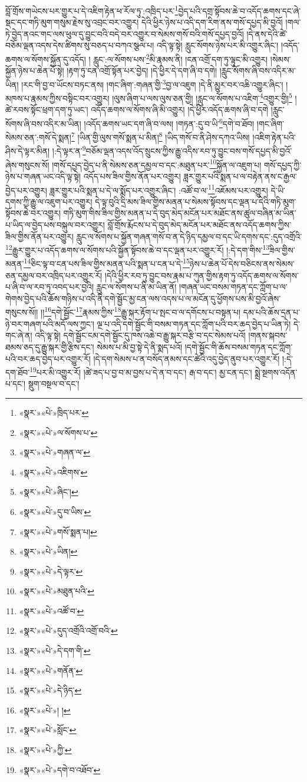 བློ་གྲོས་གཡེངས་པར་གྱུར་པ་དེ་འཇིག་རྟེན་ཕ་རོལ་ཏུ་:འཁྲིད་པར་\footnote{«སྣར་»«པེ་»ཁྲིད་པར་}བྱེད་པའི་དགྲ་སྟོབས་ཆེ་བ་འདོད་ཆགས་དང་ཞེ་སྡང་དང་གཏི་མུག་གསུམ་རྗེས་སུ་འབྲང་བར་འགྱུར། དེའི་ཕྱིར་ཉེས་པ་འདི་དག་རིག་ནས་གསོ་དཔྱད་མི་བྱའོ། །གལ་ཏེ་བྱེད་ནའང་གང་ལས་ཕུལ་དུ་བྱུང་བའི་བདེ་བར་འགྱུར་བ་སེམས་གསོ་བའི་གསོ་དཔྱད་བྱའོ། །དེ་ནས་དེའི་ཚེ་བཅོམ་ལྡན་འདས་དེས་ཚིགས་སུ་བཅད་པ་བཀའ་སྩལ་པ། འདི་ལྟ་སྟེ། རླུང་སོགས་ཉེས་པར་མི་འགྱུར་ཞིང་། །འདོད་ཆགས་ལ་སོགས་སྐྱོན་དུ་འདོད། །
རླུང་:ལ་སོགས་པས་\footnote{«སྣར་»«པེ་»ལ་སོགས་པ་}མི་རྣམས་ནི། །ངན་འགྲོ་དག་ཏུ་ལྟུང་མི་འགྱུར། །སེམས་སྐྱོན་ཉེས་པ་ཆེན་པོ་སྟེ། །རྟག་ཏུ་ངན་འགྲོ་སྟོན་པར་བྱེད། །དེ་ཕྱིར་དེ་དག་ཞི་བ་དགེ། །རླུང་སོགས་ཞི་བས་འདིར་མ་ཡིན། །རང་གི་བྱ་བ་ཡོངས་བཏང་ནས། །གང་ཞིག་:གཞན་གྱི་\footnote{«སྣར་»«པེ་»གཞན་ལ་}བྱ་ལ་འཇུག །དེ་ནི་མྱུར་བར་འཆི་འགྱུར་ཞིང་། །མཁས་པ་རྣམས་ཀྱིས་བསྟིང་བར་འགྱུར། །ལུས་ཞིག་པ་ལས་ལུས་ཅན་གྱི། །རླུང་ལ་སོགས་པ་འཇིག་\footnote{«སྣར་»«པེ་»འཇིགས་}འགྱུར་གྱི།\footnote{«སྣར་»«པེ་»ཞིང་།} །ཚེ་རབས་སྟོང་ཕྲག་དག་ཏུ་ཡང་། འདོད་ཆགས་ལ་སོགས་ཞི་མི་འགྱུར། །དེ་ཕྱིར་འདོད་ཆགས་ཞི་བ་དགེ །རླུང་སོགས་ཞི་བས་འདིར་མ་ཡིན། །འདོད་ཆགས་ཡང་དག་ཞི་བ་ལས། །གཏན་:དུ་བ་ཡི་\footnote{«སྣར་»«པེ་»དུ་བ་ཡིས་}དགེ་བ་ཐོབ། །གང་ཞིག་སེམས་ཅན་:གསོ་དེ་སྨན།\footnote{«སྣར་»«པེ་»གསོ་སྨན་པ།} །ཡིན་གྱི་ལུས་གསོ་སྨན་པ་མིན།\footnote{«སྣར་»«པེ་»ཡིན།} །ཡིད་གསོ་བ་ནི་ཤེས་དཀའ་ཡིས། །འཇིག་རྟེན་པའི་ཤིས་དེ་ལྟར་མིན། །:དེ་ལྟར་ན་\footnote{«སྣར་»«པེ་»དེ་ལྟར་}བཅོམ་ལྡན་འདས་འོད་སྲུངས་ཀྱིས་རྒྱུ་འདིས་རབ་ཏུ་བྱུང་བས་གསོ་དཔྱད་མི་བྱའོ་ཞེས་གསུངས་སོ། །གསོ་དཔྱད་བྱེད་པ་ནི་སེམས་ཅན་དམྱལ་བ་དང་:མཐུན་པར་\footnote{«སྣར་»«པེ་»མཐུན་པའི་}སྐྱོན་ལ་འཇུག་པ། གསོ་དཔྱད་ཀྱི་ཉེས་པ་གཞན་ཡང་འདི་ལྟ་སྟེ། འདོད་པས་ཟིལ་གྱིས་ནོན་པར་འགྱུར། ཟླར་གྱུར་པའི་སྨན་པ་ལ་བརྟེན་ནས་ང་རྒྱལ་བྱེད་པར་འགྱུར། ཟླར་གྱུར་པའི་སྨན་པ་དེ་ལ་སྨོད་པར་འགྱུར་ཞིང་། :འཚོ་བ་ལ་\footnote{«སྣར་»«པེ་»འཚོ་བ་}འཇོམས་པར་འགྱུར། དེ་ཡི་དགས་ཀྱི་རྒྱུ་ལ་འཇུག་པར་འགྱུར། དེ་ལྟ་བུའི་དྲི་མས་ཟིལ་གྱིས་མནན་པ་སེམས་སྟོབས་དང་ལྡན་པ་དེའི་གཏི་མུག་སྟོབས་ཆེ་བར་འགྱུར། གཏི་མུག་གིས་ཟིལ་གྱིས་མནན་པ་དེ་བུད་མེད་མངོན་པར་མཐོང་ནས་ཚུལ་བཞིན་མ་ཡིན་པ་ཡིད་ལ་བྱེད་པས་བསྐུལ་བར་འགྱུར། བློ་གྲོས་རྨོངས་པ་དེ་བུད་མེད་མངོན་པར་མཐོང་ནས་འདོད་ཆགས་ཀྱིས་ཟིལ་གྱིས་ནོན་པར་འགྱུར། རླུང་ལ་སོགས་པ་སྐྱོན་གཞན་གསོ་བ་ན་དེ་ཉིད་དམྱལ་བ་དང་ཡི་དགས་དང་:དུད་འགྲོའི་\footnote{«སྣར་»«པེ་»དུད་འགྲོའི་འགྲོ་བའི་}རྒྱུར་གྱུར་པ་འདོད་ཆགས་ལ་སོགས་པའི་སྐྱོན་སྟོབས་ཆེ་བ་དང་ལྡན་པར་འགྱུར་རོ། །:དེ་དག་གིས་\footnote{«སྣར་»«པེ་»དེ་དག་གི་}ཟིལ་གྱིས་མནན་\footnote{«སྣར་»«པེ་»གནོན་}ཅིང་ལྟ་བ་ངན་པས་ཟིལ་གྱིས་མནན་པའི་སྨན་པ་ངན་པ་དེ་\footnote{«སྣར་»«པེ་»དེ་ཉིད་}ཉེས་པ་ཆེན་པོ་དེས་བཅིངས་ནས་སེམས་ཅན་དམྱལ་བར་འཁྲིད་པར་འགྱུར་རོ། །དེའི་ཕྱིར་རབ་ཏུ་བྱུང་བས་རྣམ་པ་ཀུན་གྱིས་རྟག་ཏུ་འདོད་ཆགས་ལ་སོགས་པ་ཞི་བ་ལ་རབ་ཏུ་འབད་པར་བྱའི། རླུང་ལ་སོགས་པ་ནི་མ་ཡིན་ནོ། །གཞན་ཡང་བསམ་གཏན་དང་ཀློག་པ་ལ་གེགས་བྱེད་པའི་ཆོས་གཉིས་པ་འདི་ནི་དགེ་སྦྱོང་མྱ་ངན་ལས་འདས་པ་ལ་མངོན་དུ་ཕྱོགས་པས་མི་བྱའོ་ཞེས་གསུངས་སོ།། །།\footnote{«སྣར་»«པེ་»། །}དགེ་སྦྱོང་\footnote{«སྣར་»«པེ་»སློང་}རྣམས་ཀྱིས་\footnote{«སྣར་»«པེ་»ཀྱི་}རྒྱུ་སྐར་རྟོག་པ་སྤང་བ་ལ་དགོངས་པ་བསྟན་པ། དམ་པའི་ཆོས་དྲན་པ་ཉེ་བར་གཞག་པའི་མདོ་ལས་ཀྱང་། ལྔ་པ་འདི་དགེ་སྦྱོང་གི་བསམ་གཏན་དང་ཀློག་པའི་བར་ཆད་བྱེད་པ་ཡིན་ཏེ། དེ་གང་ཞེ་ན། འདི་ལྟ་སྟེ། དགེ་སྦྱོང་ངམ་དགེ་སྦྱོང་དུ་ཁས་འཆེ་བ་རྒྱུ་སྐར་བརྩི་བ་དང་སེམས་པའོ། །གནས་སྐབས་ཐམས་ཅད་དུ་རྒྱུ་སྐར་གྱི་རྩིས་དང་། སེམས་པ་མི་བྱ་སྟེ་དེ་ནི་སྨད་པའོ། །དགེ་སྦྱོང་གི་ཆོས་བསམ་གཏན་དང་ཀློག་པའི་བར་ཆད་བྱེད་པར་འགྱུར་རོ། །དེ་དག་སེམས་པ་ན་བསོད་ནམས་དང་ཚེའི་འདུ་བྱེད་ནུབ་པར་འགྱུར་རོ། །:དེ་དག་ཐོབ་\footnote{«སྣར་»«པེ་»དགེ་བ་འཐོབ་}པར་མི་འགྱུར་རོ། །ཚེ་ཟད་པ་བྱ་བ་མ་བྱས་པ་དེ་ན་བ་དང་། རྒ་བ་དང་། མྱ་ངན་དང་། སྨྲེ་སྔགས་འདོན་པ་དང་། སྡུག་བསྔལ་བ་དང་། 